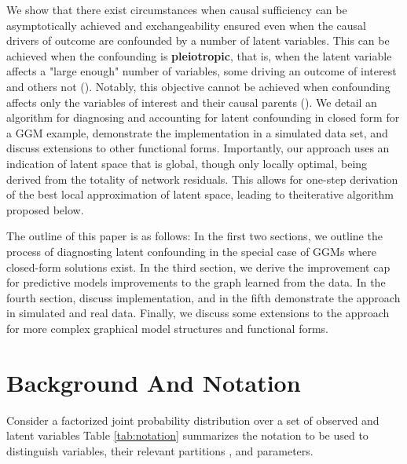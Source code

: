 \documentclass[letterpaper]{article}
\begin{document}
We show that there exist circumstances when causal sufficiency can be asymptotically achieved and exchangeability ensured even when the causal drivers of outcome are confounded by a number of latent variables.  This can be achieved when the confounding is \textbf{pleiotropic}, that is,  when the latent variable affects a "large enough" number of variables, some driving an outcome of interest and others not (\cite{anandkumar_learning_2013}).  Notably, this objective cannot be achieved when confounding affects only the variables of interest and their causal parents (\cite{damour_multi-cause_2019}). We detail an algorithm for diagnosing and accounting for latent confounding in closed form for a GGM example, demonstrate the implementation in a simulated data set, and discuss extensions to other functional forms.  Importantly, our approach uses an indication of latent space that is global, though only locally optimal, being derived from the totality of network residuals. This allows for one-step derivation of the best local approximation of latent space, leading to theiterative algorithm proposed below.

The outline of this paper is as follows: In the first two sections, we outline the process of diagnosting latent confounding in the special case of GGMs where closed-form solutions exist. In the third section, we derive the improvement cap for predictive models improvements to the graph learned from the data. In the fourth section, discuss implementation, and in the fifth demonstrate the approach in simulated and real data. Finally, we discuss some extensions to the approach for more complex graphical model structures and functional forms. 

\section{Background And Notation}
\label{Background}

Consider a factorized joint probability distribution over a set of observed and latent variables Table \ref{tab:notation} summarizes the notation to be used to distinguish variables, their relevant partitions , and parameters. 
\end{document}
